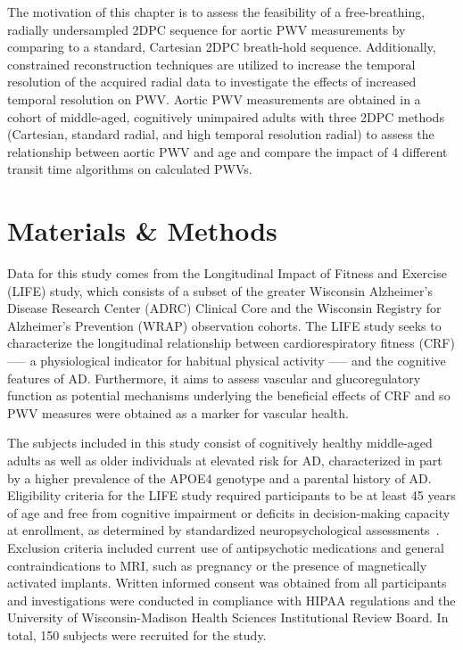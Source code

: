 The motivation of this chapter is to assess the feasibility of a free-breathing, radially undersampled 2DPC sequence for aortic PWV measurements by comparing to a standard, Cartesian 2DPC breath-hold sequence. Additionally, constrained reconstruction techniques are utilized to increase the temporal resolution of the acquired radial data to investigate the effects of increased temporal resolution on PWV\@. Aortic PWV measurements are obtained in a cohort of middle-aged, cognitively unimpaired adults with three 2DPC methods (Cartesian, standard radial, and high temporal resolution radial) to assess the relationship between aortic PWV and age and compare the impact of 4 different transit time algorithms on calculated PWVs.

\section{Materials \& Methods}\label{sec:life_methods}
Data for this study comes from the Longitudinal Impact of Fitness and Exercise (LIFE) study, which consists of a subset of the greater Wisconsin Alzheimer's Disease Research Center (ADRC) Clinical Core and the Wisconsin Registry for Alzheimer's Prevention (WRAP) observation cohorts. The LIFE study seeks to characterize the longitudinal relationship between cardiorespiratory fitness (CRF) --— a physiological indicator for habitual physical activity --— and the cognitive features of AD\@. Furthermore, it aims to assess vascular and glucoregulatory function as potential mechanisms underlying the beneficial effects of CRF and so PWV measures were obtained as a marker for vascular health\@. 

The subjects included in this study consist of cognitively healthy middle-aged adults as well as older individuals at elevated risk for AD, characterized in part by a higher prevalence of the APOE4 genotype and a parental history of AD\@. Eligibility criteria for the LIFE study required participants to be at least 45 years of age and free from cognitive impairment or deficits in decision-making capacity at enrollment, as determined by standardized neuropsychological assessments~\cite{jackNIAAAResearchFramework2018,langhoughkoscikValidityEvidenceResearch2021}. Exclusion criteria included current use of antipsychotic medications and general contraindications to MRI, such as pregnancy or the presence of magnetically activated implants. Written informed consent was obtained from all participants and investigations were conducted in compliance with HIPAA regulations and the University of Wisconsin-Madison Health Sciences Institutional Review Board. In total, 150 subjects were recruited for the study.

